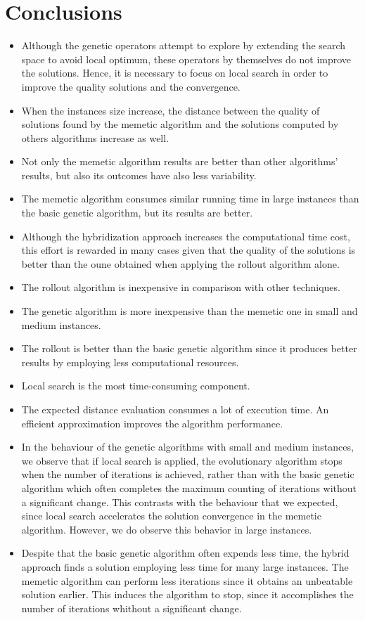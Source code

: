 \chapter{Conclusions}
\label{chap:conclusions}


\begin{itemize}
 \item Although the genetic operators attempt to explore by extending the search space to avoid local optimum, these operators by themselves do not improve the solutions. Hence, it is necessary to focus on local search in order to improve the quality solutions and the convergence.
 \item When the instances size increase, the distance between the quality of solutions found by the memetic algorithm and the solutions computed by others algorithms increase as well.
 \item Not only the memetic algorithm results are better than other algorithms' results, but also its outcomes have also less variability.
 \item The memetic algorithm consumes similar running time in large instances than the basic genetic algorithm, but its results are better.
 \item Although the hybridization approach increases the computational time cost, this effort is rewarded in many cases given that the quality of the solutions is better than the oune obtained when applying the rollout algorithm alone. 
 \item The rollout algorithm is inexpensive in comparison with other techniques.
 \item The genetic algorithm is more inexpensive than the memetic one in small and medium instances.
 \item The rollout is better than the basic genetic algorithm since it produces better results by employing less computational resources.
 \item Local search is the most time-consuming component.
 \item The expected distance evaluation consumes a lot of execution time. An efficient approximation improves the algorithm performance.
 \item In the behaviour of the genetic algorithms with small and medium instances, we observe that if local search is applied, the evolutionary algorithm stops when the number of iterations is achieved, rather than with the basic genetic algorithm which often completes the maximum counting of iterations without a significant change. This contrasts with the behaviour that we expected, since local search accelerates the solution convergence in the memetic algorithm. However, we do observe this behavior in large instances.
 \item Despite that the basic genetic algorithm often expends less time, the hybrid approach finds a solution employing less time for many large instances. The memetic algorithm can perform less iterations since it obtains an unbeatable solution earlier. This induces the algorithm to stop, since it accomplishes the number of iterations whithout a significant change.
 
\end{itemize}
